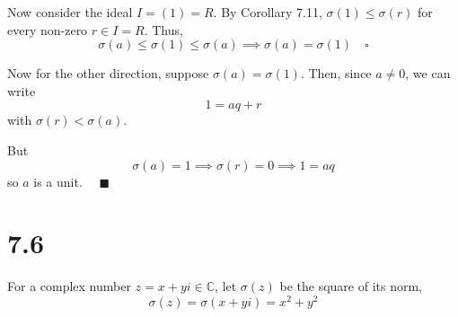 \documentclass[12pt]{article}
\newcommand{\C}{\mathbb{C}}
\newcommand{\qed}{\quad \blacksquare}
\begin{document}
        Now consider the ideal $I = (1) = R$. By Corollary 7.11, $\sigma(1) \leq \sigma(r)$ for every non-zero $r \in I = R$. Thus, 
        \[\sigma(a) \leq \sigma(1) \leq \sigma(a) \implies \sigma(a) = \sigma(1) \quad \square\]
        
        Now for the other direction, suppose $\sigma(a) = \sigma(1)$. Then, since $a \neq 0$, we can write 
        \[1 = aq + r\]
        with $\sigma(r) < \sigma(a)$. 

        But 
        \[\sigma(a) = 1 \implies \sigma(r) = 0 \implies 1 = aq\] 
        so $a$ is a unit. $\qed$
    \color{black}
\pagebreak

\section*{7.6}
For a complex number $z = x + yi \in \C$, let $\sigma(z)$ be the square of its norm,
\[\sigma(z) = \sigma(x + yi) = x^2 + y^2\]
\end{document}
